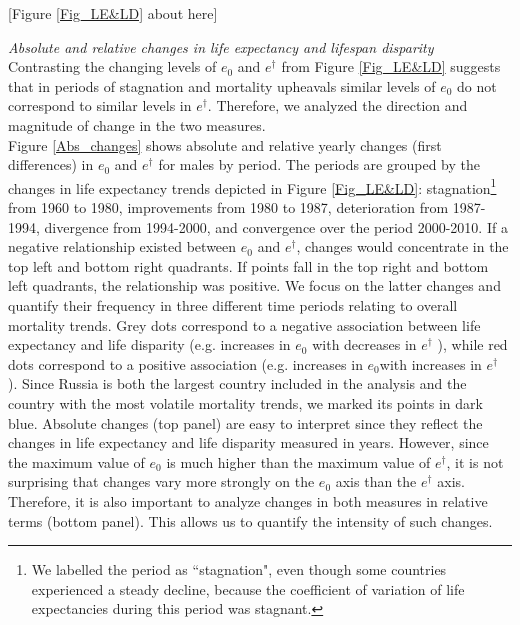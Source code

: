 \documentclass{article}
\begin{document}
\begin{spacing}{1.5}
\begin{center}
[Figure \ref{Fig_LE&LD} about here]
\end{center}

\emph{Absolute and relative changes in life expectancy and lifespan disparity}\\


Contrasting the changing levels of $e_0$ and $e^\dagger$ from Figure \ref{Fig_LE&LD} suggests that in periods of stagnation and mortality upheavals similar levels of $e_0$ do not correspond to similar levels in $e^\dagger$. Therefore, we analyzed the direction and magnitude of change in the two measures. \\

Figure \ref{Abs_changes} shows absolute and relative yearly changes (first differences) in $e_0$ and $e^\dagger$ for males by period. The periods are grouped by the changes in life expectancy trends depicted in Figure \ref{Fig_LE&LD}: stagnation\footnote{We labelled the period as ``stagnation", even though some countries experienced a steady decline, because the coefficient of variation of life expectancies during this period was stagnant.} from 1960 to 1980, improvements from 1980 to 1987, deterioration from 1987-1994, divergence from 1994-2000, and convergence over the period 2000-2010.  If a negative relationship existed between $e_0$ and $e^\dagger$, changes would concentrate in the top left and bottom right quadrants. If points fall in the top right and bottom left quadrants, the relationship was positive. We focus on the latter changes and quantify their frequency in three different time periods relating to overall mortality trends. Grey dots correspond to a negative association between life expectancy and life disparity (e.g. increases in $e_0$ with decreases in $e^\dagger$ ), while red dots correspond to a positive association (e.g. increases in $e_0$with increases in $e^\dagger$ ). Since Russia is both the largest country included in the analysis and the country with the most volatile mortality trends, we marked its points in dark blue. Absolute changes (top panel) are easy to interpret since they reflect the changes in life expectancy and life disparity measured in years. However, since the maximum value of $e_0$ is much higher than the maximum value of $e^\dagger$, it is not surprising that changes vary more strongly on the  $e_0$ axis than the $e^\dagger$ axis. Therefore, it is also important to analyze changes in both measures in relative terms (bottom panel).  This allows us to quantify the intensity of such changes.\\


\end{spacing}
\end{document}
